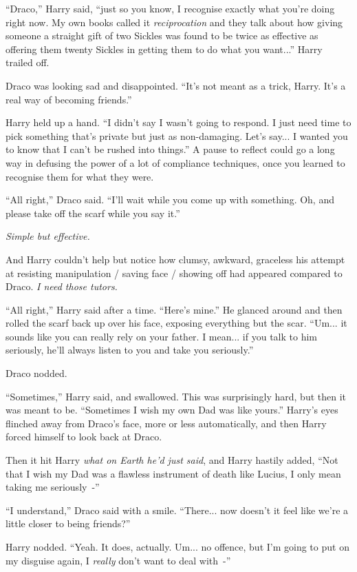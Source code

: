 ``Draco,'' Harry said, ``just so you know, I recognise exactly what you're doing right now. My own books called it \emph{reciprocation} and they talk about how giving someone a straight gift of two Sickles was found to be twice as effective as offering them twenty Sickles in getting them to do what you want...'' Harry trailed off.

Draco was looking sad and disappointed. ``It's not meant as a trick, Harry. It's a real way of becoming friends.''

Harry held up a hand. ``I didn't say I wasn't going to respond. I just need time to pick something that's private but just as non-damaging. Let's say... I wanted you to know that I can't be rushed into things.'' A pause to reflect could go a long way in defusing the power of a lot of compliance techniques, once you learned to recognise them for what they were.

``All right,'' Draco said. ``I'll wait while you come up with something. Oh, and please take off the scarf while you say it.''

\emph{Simple but effective.}

And Harry couldn't help but notice how clumsy, awkward, graceless his attempt at resisting manipulation / saving face / showing off had appeared compared to Draco. \emph{I need those tutors.}

``All right,'' Harry said after a time. ``Here's mine.'' He glanced around and then rolled the scarf back up over his face, exposing everything but the scar. ``Um... it sounds like you can really rely on your father. I mean... if you talk to him seriously, he'll always listen to you and take you seriously.''

Draco nodded.

``Sometimes,'' Harry said, and swallowed. This was surprisingly hard, but then it was meant to be. ``Sometimes I wish my own Dad was like yours.'' Harry's eyes flinched away from Draco's face, more or less automatically, and then Harry forced himself to look back at Draco.

Then it hit Harry \emph{what on Earth he'd just said}, and Harry hastily added, ``Not that I wish my Dad was a flawless instrument of death like Lucius, I only mean taking me seriously~-''

``I understand,'' Draco said with a smile. ``There... now doesn't it feel like we're a little closer to being friends?''

Harry nodded. ``Yeah. It does, actually. Um... no offence, but I'm going to put on my disguise again, I \emph{really} don't want to deal with~-''

